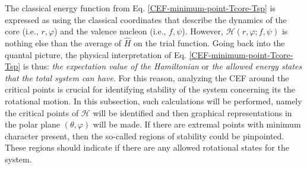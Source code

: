 The classical energy function from Eq. \ref{CEF-minimum-point-Tcore-Tsp} is expressed as using the classical coordinates that describe the dynamics of the core (i.e., $r,\varphi$) and the valence nucleon (i.e., $f,\psi$). However, $\mathcal{H}(r,\varphi;f,\psi)$ is nothing else than the average of $\hat{H}$ on the trial function. Going back into the quantal picture, the physical interpretation of Eq. \ref{CEF-minimum-point-Tcore-Tsp} is thus: \emph{the expectation value of the Hamiltonian} or \emph{the allowed energy states that the total system can have}. For this reason, analyzing the CEF around the critical points is crucial for identifying stability of the system concerning its the rotational motion. In this subsection, such calculations will be performed, namely the critical points of $\mathcal{H}$ will be identified and then graphical representations in the polar plane $(\theta,\varphi)$ will be made. If there are extremal points with minimum character present, then the so-called regions of stability could be pinpointed. These regions should indicate if there are any allowed rotational states for the system.

